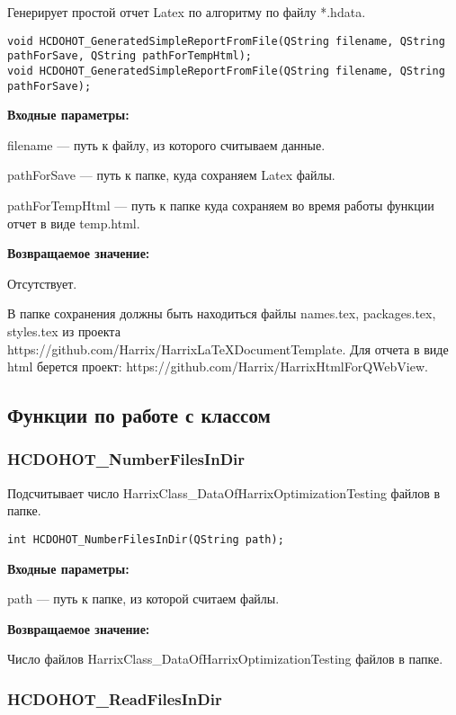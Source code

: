 \documentclass[a4paper,12pt]{article}
\begin{document}
Генерирует простой отчет Latex по алгоритму по файлу *.hdata.


\begin{lstlisting}[label=code_syntax_HCDOHOT_GeneratedSimpleReportFromFile,caption=Синтаксис]
void HCDOHOT_GeneratedSimpleReportFromFile(QString filename, QString pathForSave, QString pathForTempHtml);
void HCDOHOT_GeneratedSimpleReportFromFile(QString filename, QString pathForSave);
\end{lstlisting}

\textbf{Входные параметры:}

filename --- путь к файлу, из которого считываем данные.

pathForSave --- путь к папке, куда сохраняем Latex файлы.

pathForTempHtml --- путь к папке куда сохраняем во время работы функции отчет в виде temp.html.

\textbf{Возвращаемое значение:}

Отсутствует.

В папке сохранения должны быть находиться файлы names.tex, packages.tex, styles.tex из проекта https://github.com/Harrix/HarrixLaTeXDocumentTemplate. Для отчета в виде html берется проект: https://github.com/Harrix/HarrixHtmlForQWebView.


\subsection{Функции по работе с классом}

\subsubsection{HCDOHOT\_NumberFilesInDir}\label{HCDOHOT_NumberFilesInDir}

Подсчитывает число HarrixClass\_DataOfHarrixOptimizationTesting файлов в папке.


\begin{lstlisting}[label=code_syntax_HCDOHOT_NumberFilesInDir,caption=Синтаксис]
int HCDOHOT_NumberFilesInDir(QString path);
\end{lstlisting}

\textbf{Входные параметры:}

path --- путь к папке, из которой считаем файлы.

\textbf{Возвращаемое значение:}

Число файлов HarrixClass\_DataOfHarrixOptimizationTesting файлов в папке.


\subsubsection{HCDOHOT\_ReadFilesInDir}\label{HCDOHOT_ReadFilesInDir}
\end{document}
